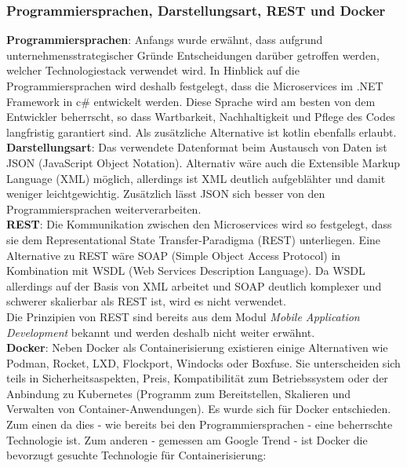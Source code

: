 {\subsubsection{Programmiersprachen, Darstellungsart, REST und Docker}
\textbf{Programmiersprachen}: Anfangs wurde erwähnt, dass aufgrund unternehmensstrategischer Gründe Entscheidungen darüber getroffen werden, welcher Technologiestack verwendet wird. In Hinblick auf die Programmiersprachen wird deshalb festgelegt, dass die Microservices im .NET Framework in c\# entwickelt werden. Diese Sprache wird am besten von dem Entwickler beherrscht, so dass Wartbarkeit, Nachhaltigkeit und Pflege des Codes langfristig garantiert sind. Als zusätzliche Alternative ist kotlin ebenfalls erlaubt.\\

\textbf{Darstellungsart}: Das verwendete Datenformat beim Austausch von Daten ist JSON (JavaScript Object Notation). Alternativ wäre auch die Extensible Markup Language (XML) möglich, allerdings ist XML deutlich aufgeblähter und damit weniger leichtgewichtig. Zusätzlich lässt JSON sich besser von den Programmiersprachen weiterverarbeiten.\cite{jsonxml2006heise}\\

\textbf{REST}: Die Kommunikation zwischen den Microservices wird so festgelegt, dass sie dem Representational State Transfer-Paradigma (REST) unterliegen. Eine Alternative zu REST wäre SOAP (Simple Object Access Protocol) in Kombination mit WSDL (Web Services Description Language). Da WSDL allerdings auf der Basis von XML arbeitet und SOAP deutlich komplexer und schwerer skalierbar als REST ist, wird es nicht verwendet. \cite{ayadi2008rest_vs_soap}\\ 

Die Prinzipien von REST sind bereits aus dem Modul \textit{Mobile Application Development} bekannt und werden deshalb nicht weiter erwähnt. \\

\textbf{Docker}: Neben Docker als Containerisierung existieren einige Alternativen wie Podman, Rocket, LXD, Flockport, Windocks oder Boxfuse. Sie unterscheiden sich teils in Sicherheitsaspekten, Preis, Kompatibilität zum Betriebssystem oder der Anbindung zu Kubernetes (Programm zum Bereitstellen, Skalieren und Verwalten von Container-Anwendungen).\cite{heise2019Podman}\cite{t3n2017Container} Es wurde sich für Docker entschieden. Zum einen da dies - wie bereits bei den Programmiersprachen - eine beherrschte Technologie ist. Zum anderen - gemessen am Google Trend - ist Docker die bevorzugt gesuchte Technologie für Containerisierung:  

}
